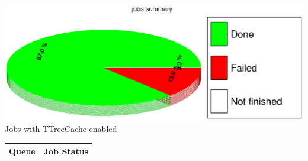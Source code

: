 \includegraphics[width=\textwidth]{../PieChart/job/mcanvas.eps}
Jobs with TTreeCache enabled 

\begin{longtable}{|c|c|}

	\hline

	Queue & Job Status\\\hline
	\endhead


\end{longtable}

